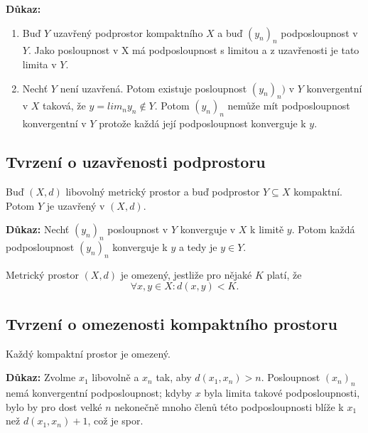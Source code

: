 \documentclass[10pt]{article}
\begin{document}
\vspace{5mm}
\noindent
\textbf{Důkaz:} 
\begin{enumerate}
    \item Buď $Y$ uzavřený podprostor kompaktního $X$ a buď $(y_n)_n$ podposloupnost v $Y$. Jako posloupnost v X má podposloupnost s limitou
    a z uzavřenosti je tato limita v $Y$.
    \item Nechť $Y$ není uzavřená. Potom existuje posloupnost $(y_n)_n)$ v $Y$ konvergentní v $X$ taková, že $y = lim_n y_n \notin Y$. Potom $(y_n)_n$
    nemůže mít podposloupnost konvergentní v $Y$ protože každá její podposloupnost konverguje k $y$.
\end{enumerate}

\subsection{Tvrzení o uzavřenosti podprostoru}
\hspace{1.2mm}
\noindent
Buď $(X,d)$ libovolný metrický prostor a
buď podprostor $Y \subseteq X$ kompaktní. Potom $Y$ je uzavřený v $(X,d)$.

\vspace{5mm}
\noindent
\textbf{Důkaz:} Nechť $(y_n)_n$ posloupnost v $Y$ konverguje v $X$ k limitě $y$. Potom každá podposloupnost $(y_n)_n$ konverguje k 
$y$ a tedy je $y \in Y$.
\begin{center}
    Metrický prostor $(X,d)$ je omezený, jestliže pro nějaké $K$ platí, že 
    \[\forall x,y \in X : d(x,y) < K.\]
\end{center}

\subsection{Tvrzení o omezenosti kompaktního prostoru}
\hspace{1.2mm}
\noindent
Každý kompaktní prostor je omezený.

\vspace{5mm}
\noindent
\textbf{Důkaz:} Zvolme $x_1$ libovolně a $x_n$ tak, aby $d(x_1,x_n) > n$. Posloupnost $(x_n)_n$ nemá konvergentní podposloupnost; kdyby $x$
byla limita takové podposloupnosti, bylo by pro dost velké $n$ nekonečně mnoho členů této podposloupnosti blíže k $x_1$ než $d(x_1,x_n)+1$, což je spor.
\end{document}
